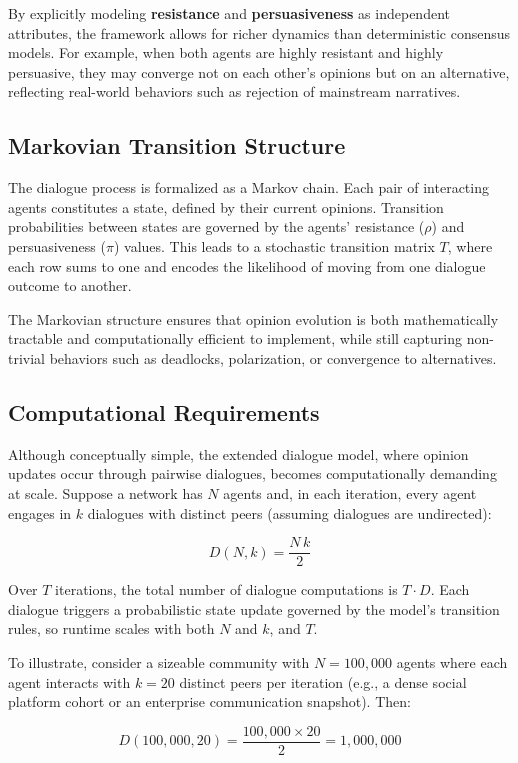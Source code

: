 \documentclass[
]{ceurart}
\begin{document}
By explicitly modeling \textbf{resistance} and \textbf{persuasiveness} as independent attributes, the framework allows for richer dynamics than deterministic consensus models. For example, when both agents are highly resistant and highly persuasive, they may converge not on each other’s opinions but on an alternative, reflecting real-world behaviors such as rejection of mainstream narratives.


\subsection{Markovian Transition Structure}
The dialogue process is formalized as a Markov chain. Each pair of interacting agents constitutes a state, defined by their current opinions. Transition probabilities between states are governed by the agents' resistance ($\rho$) and persuasiveness ($\pi$) values. This leads to a stochastic transition matrix $T$, where each row sums to one and encodes the likelihood of moving from one dialogue outcome to another.

The Markovian structure ensures that opinion evolution is both mathematically tractable and computationally efficient to implement, while still capturing non-trivial behaviors such as deadlocks, polarization, or convergence to alternatives.


\subsection{Computational Requirements}
Although conceptually simple, the extended dialogue model, where opinion updates occur through pairwise dialogues, becomes computationally demanding at scale. Suppose a network has $N$ agents and, in each iteration, every agent engages in $k$ dialogues with distinct peers (assuming dialogues are undirected):

\[
D(N,k)=\frac{N\,k}{2}
\]

Over $T$ iterations, the total number of dialogue computations is $T \cdot D$. Each dialogue triggers a probabilistic state update governed by the model's transition rules, so runtime scales with both $N$ and $k$, and $T$.

To illustrate, consider a sizeable community with $N=100{,}000$ agents where each agent interacts with $k=20$ distinct peers per iteration (e.g., a dense social platform cohort or an enterprise communication snapshot). Then:

\[
D(100{,}000,20)=\frac{100{,}000 \times 20}{2}=1{,}000{,}000
\]
\end{document}
